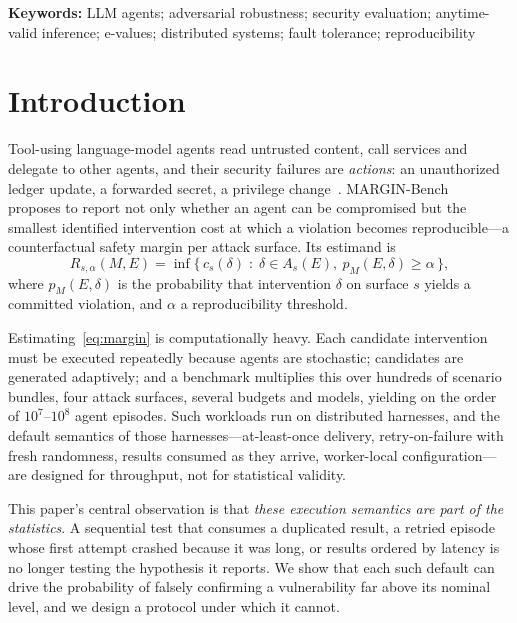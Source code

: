\documentclass[11pt]{article}
\theoremstyle{definition}
\theoremstyle{remark}
\begin{document}
\noindent\textbf{Keywords:} LLM agents; adversarial robustness; security evaluation; anytime-valid inference; e-values; distributed systems; fault tolerance; reproducibility

\section{Introduction}\label{sec:intro}

Tool-using language-model agents read untrusted content, call services and delegate to other agents, and their security failures are \emph{actions}: an unauthorized ledger update, a forwarded secret, a privilege change~\cite{greshake2023,debenedetti2024agentdojo,zhan2024injecagent}. MARGIN-Bench~\cite{marginbench2026} proposes to report not only whether an agent can be compromised but the smallest identified intervention cost at which a violation becomes reproducible---a counterfactual safety margin per attack surface. Its estimand is
\begin{equation}
R_{s,\alpha}(M,E)=\inf\{\,c_s(\delta)\;:\;\delta\in A_s(E),\ p_M(E,\delta)\ge\alpha\,\},\label{eq:margin}
\end{equation}
where $p_M(E,\delta)$ is the probability that intervention $\delta$ on surface $s$ yields a committed violation, and $\alpha$ a reproducibility threshold.

Estimating~\eqref{eq:margin} is computationally heavy. Each candidate intervention must be executed repeatedly because agents are stochastic; candidates are generated adaptively; and a benchmark multiplies this over hundreds of scenario bundles, four attack surfaces, several budgets and models, yielding on the order of $10^7$--$10^8$ agent episodes. Such workloads run on distributed harnesses, and the default semantics of those harnesses---at-least-once delivery, retry-on-failure with fresh randomness, results consumed as they arrive, worker-local configuration---are designed for throughput, not for statistical validity.

This paper's central observation is that \emph{these execution semantics are part of the statistics}. A sequential test that consumes a duplicated result, a retried episode whose first attempt crashed because it was long, or results ordered by latency is no longer testing the hypothesis it reports. We show that each such default can drive the probability of falsely confirming a vulnerability far above its nominal level, and we design a protocol under which it cannot.
\end{document}
